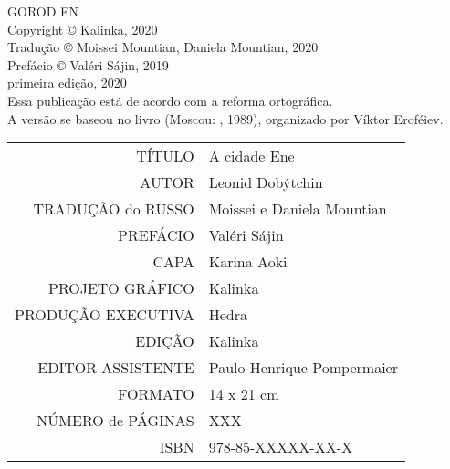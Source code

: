\newpage
\pagestyle{empty}
\MyriadPro
\scriptsize
\begin{center}
GOROD EN\\[6pt]

Copyright © Kalinka, 2020\\[6pt]

Tradução © Moissei Mountian, Daniela Mountian, 2020\\[6pt]

Prefácio © Valéri Sájin, 2019\\[6pt]

primeira edição, 2020\\[40pt]


Essa publicação está de acordo com a reforma ortográfica.\\[6pt]
A versão se baseou no livro {} (Moscou: {}, 1989), organizado por Víktor Eroféiev.\\[6pt]	
\end{center}


\bigskip

\begin{vplace}[1]
\begin{table}[ht!]
\centering
\MyriadPro\itshape
\scriptsize
\begin{tabular}{rl}
TÍTULO            & A cidade Ene 									   \\[2pt]
AUTOR             & Leonid Dobýtchin                          		   \\[2pt]
TRADUÇÃO do RUSSO & Moissei e Daniela Mountian		                   \\[2pt]
PREFÁCIO          & Valéri Sájin	                                   \\[2pt]
CAPA              & Karina Aoki		                                   \\[2pt]
PROJETO GRÁFICO   & Kalinka                                            \\[2pt]
PRODUÇÃO EXECUTIVA & Hedra                                             \\[2pt]
EDIÇÃO            & Kalinka 		                                   \\[2pt] 
EDITOR-ASSISTENTE & Paulo Henrique Pompermaier                         \\[2pt] 
FORMATO           & 14 x 21 cm                                         \\[2pt]
NÚMERO de PÁGINAS & XXX                                                \\[2pt]
ISBN              & 978-85-XXXXX-XX-X                                 
\end{tabular}
\end{table}
\end{vplace}

